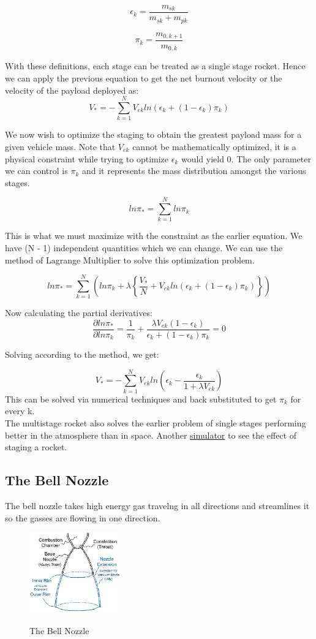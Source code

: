 \documentclass[12pt, letterpaper]{article}
\begin{document}
\[
	\epsilon_k = \frac{m_{sk}}{m_{sk} + m_{pk}}
\] 

\[
	\pi_k = \frac{m_{0,k+1}}{m_{0,k}}
\]

With these definitions, each stage can be treated as a single stage rocket. Hence we can apply the previous equation to get the net burnout velocity or the velocity of the payload deployed as:
\[
	V_* = - \sum_{k=1}^{N} V_{ek}ln(\epsilon_k + (1-\epsilon_k) \pi_k)
\]

We now wish to optimize the staging to obtain the greatest payload mass for a given vehicle mass. Note that $V_{ek}$ cannot be mathematically optimized, it is a physical constraint while trying to optimize $\epsilon_{k}$ would yield $0$. The only parameter we can control is $\pi_k$ and it represents the mass distribution amongst the various stages.

\[
	ln\pi_* = \sum_{k=1}^{N} ln\pi_k
\]

This is what we must maximize with the constraint as the earlier equation. We have (N - 1) independent quantities which we can change. We can use the method of Lagrange Multiplier to solve this optimization problem.

\[
	ln\pi_* = \sum_{k=1}^{N}\left( ln\pi_k + \lambda \left\{ \frac{V_*}{N} + V_{ek}ln(\epsilon_k + (1-\epsilon_k) \pi_k) \right\} \right) 
\]

Now calculating the partial derivatives:
\[
	\frac{\partial ln\pi_*}{\partial ln\pi_k} = \frac{1}{\pi_k} + \frac{\lambda V_{ek}(1 - \epsilon_k)}{\epsilon_k + (1-\epsilon_k) \pi_k} = 0
\]

Solving according to the method, we get:

\[
	V_* = - \sum_{k=1}^{N} V_{ek} ln\left( \epsilon_k - \frac{\epsilon_k}{1 + \lambda V_{ek}} \right)
\]
This can be solved via numerical techniques and back substituted to get $\pi_k$ for every k.\\

The multistage rocket also solves the earlier problem of single stages performing better in the atmosphere than in space. 
Another \href{https://www.grc.nasa.gov/WWW/K-12/rocket/rktstage.html}{simulator} to see the effect of staging a rocket.
\newpage
\subsection{The Bell Nozzle}
The bell nozzle takes high energy gas travelng in all directions and streamlines it so the gasses are flowing in one direction.

\begin{figure}[ht]
	\centering
    \includegraphics[width = 150px]{nozzle}
    \label{fig:nozzle}
    \caption{The Bell Nozzle}
\end{figure}
\end{document}
